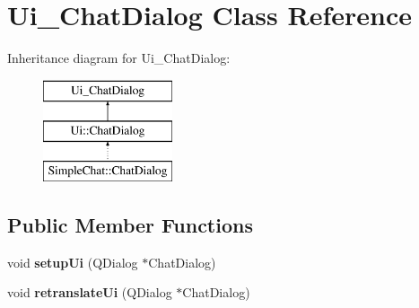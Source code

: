 \hypertarget{classUi__ChatDialog}{\section{Ui\-\_\-\-Chat\-Dialog Class Reference}
\label{classUi__ChatDialog}
}
Inheritance diagram for Ui\-\_\-\-Chat\-Dialog\-:\begin{figure}[H]
\begin{center}
\leavevmode
\includegraphics[height=3.000000cm]{classUi__ChatDialog}
\end{center}
\end{figure}
\subsection*{Public Member Functions}
\begin{DoxyCompactItemize}
\item 
\hypertarget{classUi__ChatDialog_ab8af0aca3bfb17111fb9992abba3519f}{void {\bfseries setup\-Ui} (Q\-Dialog $\ast$Chat\-Dialog)}\label{classUi__ChatDialog_ab8af0aca3bfb17111fb9992abba3519f}

\item 
\hypertarget{classUi__ChatDialog_a8a8431d8119a676a8f7712f34a72d6f2}{void {\bfseries retranslate\-Ui} (Q\-Dialog $\ast$Chat\-Dialog)}\label{classUi__ChatDialog_a8a8431d8119a676a8f7712f34a72d6f2}

\end{DoxyCompactItemize}
